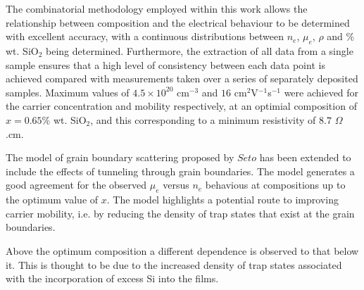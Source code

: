 \documentclass[preprint]{elsarticle}
\begin{document}
The combinatorial methodology employed within this work allows the relationship between composition and the electrical behaviour to be determined with excellent accuracy, with a continuous distributions between $n_e$, $\mu_e$, $\rho$ and $\%$ wt. SiO$_{2}$ being determined. Furthermore, the extraction of all data from a single sample ensures that a high level of consistency between each data point is achieved compared with measurements taken over a series of separately deposited samples. Maximum values of $4.5\times10^{20}$ cm$^{-3}$ and $16$ cm$^{2}$V$^{-1}$s$^{-1}$ were achieved for the carrier concentration and mobility respectively, at an optimial composition of $x =0.65\%$ wt. SiO$_2$, and this corresponding to a minimum resistivity of $8.7$ $\Omega$.cm.

The model of grain boundary scattering proposed by $Seto$ \cite{Seto1975} has been extended to include the effects of tunneling through grain boundaries. The model generates a good agreement for the observed $\mu_e$ versus $n_e$ behavious at compositions up to the optimum value of $x$. The model highlights a potential route to improving carrier mobility, i.e. by reducing the density of trap states that exist at the grain boundaries.

Above the optimum composition a different dependence is observed to that below it. This is thought to be due to the increased density of trap states associated with the incorporation of excess Si into the films.




\end{document}
